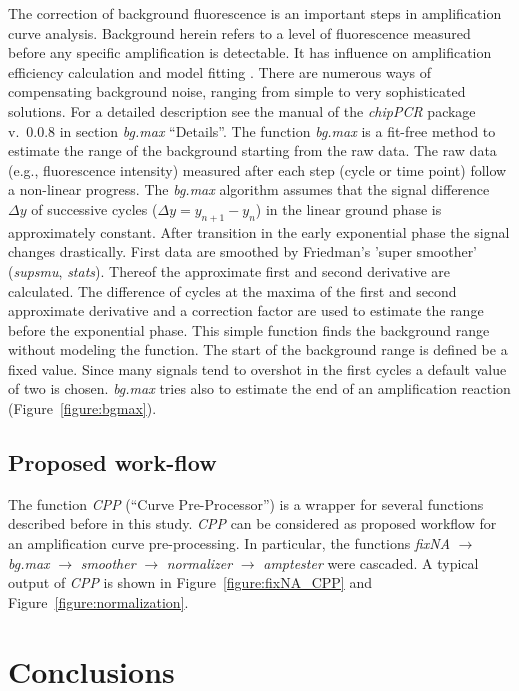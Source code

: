 \documentclass[twocolumn]{bmcart}%
\begin{document}
  The correction of background fluorescence is an important steps in 
amplification curve analysis. Background herein refers to a level of 
fluorescence measured before any specific amplification is detectable. It has 
influence on amplification efficiency calculation and model fitting 
\cite{tuomi_2010, rutledge_2008, ruijter_2009}. There are numerous ways of 
compensating background noise, ranging from simple to very sophisticated 
solutions. For a detailed description see the manual of the \textsl{chipPCR} 
package v.~0.0.8 in section \textsl{bg.max} ``Details''. The function 
\textsl{bg.max} is a fit-free method to estimate the range of the background 
starting from the raw data. The raw data (e.g., fluorescence intensity) 
measured 
after each step (cycle or time point) follow a non-linear progress. The 
\textsl{bg.max} algorithm assumes that the signal difference $\Delta{y}$ of 
successive cycles ($\Delta{y} = y_{n + 1} - y_n$) in the linear ground phase is 
approximately constant. After transition in the early exponential phase the 
signal changes drastically. First data are smoothed by Friedman’s ’super 
smoother’ (\textsl{supsmu}, \emph{stats}). Thereof the approximate first and 
second derivative are calculated. The difference of cycles at the maxima of the 
first and second approximate derivative and a correction factor are used to 
estimate the range before the exponential phase. This simple function finds the 
background range without modeling the function. The start of the background 
range is defined be a fixed value. Since many signals tend to overshot in the 
first cycles a default value of two is chosen. \textsl{bg.max} tries also to 
estimate the end of an amplification reaction (Figure~\ref{figure:bgmax}).

\subsection*{Proposed work-flow}

The function \textsl{CPP} (``Curve Pre-Processor'') is a wrapper for several 
functions described before in this study. \textsl{CPP} 
can be considered as proposed workflow for an amplification curve 
pre-processing. In particular, the functions \textsl{fixNA} $\rightarrow$ 
\textsl{bg.max} $\rightarrow$ \textsl{smoother} $\rightarrow$ 
\textsl{normalizer} $\rightarrow$ \textsl{amptester} were cascaded. A typical 
output of \textsl{CPP} is shown in Figure~\ref{figure:fixNA_CPP} and 
Figure~\ref{figure:normalization}.

\section*{Conclusions}
\end{document}
